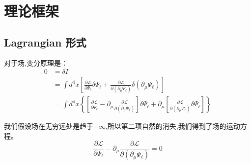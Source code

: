 \section{理论框架}
\subsection{Lagrangian 形式}对于场,变分原理是：
\begin{equation*}
    \begin{aligned}
        0 &= \delta I \\
        &= \int d^4x \left[ \frac{\partial \mathscr{L}}{\partial \Psi_\ell} \delta\Psi_\ell + \frac{\partial \mathscr{L}}{\partial (\partial_\mu \Psi_\ell)} \delta(\partial_\mu \Psi_\ell) \right] \\
        &= \int d^4x \left\{ \left[ \frac{\partial \mathscr{L}}{\partial \Psi_\ell} - \partial_\mu \frac{\partial \mathscr{L}}{\partial (\partial_\mu \Psi_\ell)} \right] \delta\Psi_\ell +
        \partial_\mu \left[ \frac{\partial \mathscr{L}}{\partial (\partial_\mu \Psi_\ell)} \delta\Psi_\ell \right] \right\}
    \end{aligned}
\end{equation*}

\noindent
我们假设场在无穷远处是趋于$-\infty$,所以第二项自然的消失,我们得到了场的运动方程。
    \begin{equation}
    \frac{\partial \mathscr{L}}{\partial \Psi_\ell} - \partial_\mu \frac{\partial \mathscr{L}}{\partial (\partial_\mu \Psi_\ell)} = 0
\end{equation}
